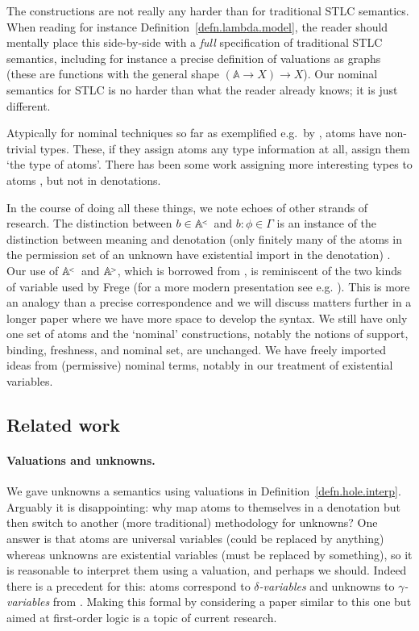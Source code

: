 \documentclass[submission,copyright]{eptcs}
\newcommand\atomsdown{\mathbb A^{\hspace{-.3ex}{}_{{}^<}}}
\newcommand\atomsup{\mathbb A^{\hspace{-.3ex}{}_{{}^>}\!}} \newcommand\basesort{\tau}
\begin{document}
The constructions are not really any harder than for traditional STLC semantics.
When reading for instance Definition~\ref{defn.lambda.model}, the reader should mentally place this side-by-side with a \emph{full} specification of traditional STLC semantics, including for instance a precise definition of valuations as graphs (these are functions with the general shape $(\mathbb A\to X)\to X$).
Our nominal semantics for STLC is no harder than what the reader already knows; it is just different.
 

Atypically for nominal techniques so far as exemplified e.g.\ by \cite{gabbay:nomu-jv,gabbay:frepbm,cheney:alppl,gabbay:pernl}, atoms have non-trivial types. 
These, if they assign atoms any type information at all, assign them `the type of atoms'.
There has been some work assigning more interesting types to atoms \cite{gabbay:curstn}, but not in denotations.

In the course of doing all these things, we note echoes of other strands of research.
The distinction between $b\in\atomsdown$ and $b:\phi\in\Gamma$ is an instance of the distinction between meaning and denotation (only finitely many of the atoms in the permission set of an unknown have existential import in the denotation) \cite{russell:ond,lambert:exiir}.
Our use of $\atomsdown$ and $\atomsup$, which is borrowed from \cite{gabbay:perntu,gabbay:perntu-jv}, is reminiscent of the two kinds of variable used by Frege \cite{heijenoort:fregsb} (for a more modern presentation see e.g. \cite[Chapter~IV, Section~1]{smullyan:firol}).
This is more an analogy than a precise correspondence and we will discuss matters further in a longer paper where we have more space to develop the syntax.
We still have only one set of atoms and the `nominal' constructions, notably the notions of support, binding, freshness, and nominal set, are unchanged.
We have freely imported ideas from (permissive) nominal terms, notably in our treatment of existential variables.



\subsection{Related work}

\paragraph{Valuations and unknowns.} 
We gave unknowns a semantics using valuations in Definition~\ref{defn.hole.interp}.
Arguably it is disappointing: why map atoms to themselves in a denotation but then switch to another (more traditional) methodology for unknowns?
One answer is that atoms are universal variables (could be replaced by anything) whereas unknowns are existential variables (must be replaced by something), so it is reasonable to interpret them using a valuation, and perhaps we should. 
Indeed there is a precedent for this: atoms correspond to \emph{$\delta$-variables} and unknowns to \emph{$\gamma$-variables} from \cite{Wirth:desid}.
Making this formal by considering a paper similar to this one but aimed at first-order logic is a topic of current research.
\end{document}
